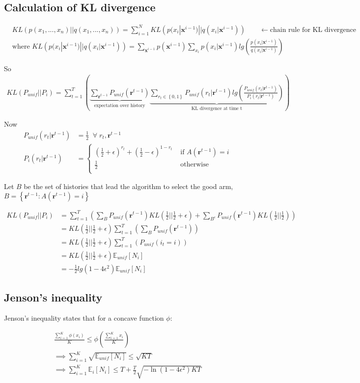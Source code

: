 \documentclass{article}
\newcommand{\E}{\mathbb E}
\newcommand{\set}[1]{\left\{#1\right\}}
\newcommand{\eqn}[1]{\begin{align}#1\end{align}}
\renewcommand{\Pi}[1]{P_i\left( #1 \right)}
\newcommand{\Pu}[1]{P_{unif}\left( #1 \right)}
\newcommand{\Ei}[1]{\E_i\left[ #1 \right]}
\newcommand{\Eu}[1]{\E_{unif}\left[ #1 \right]}
\renewcommand{\r}{\boldsymbol{r}}
\renewcommand{\log}[1]{lg\left( #1 \right)}
\newcommand{\kl}[2]{KL\left(#1 || #2 \right)}
\theoremstyle{plain}
\theoremstyle{definition}
\begin{document}
\subsection{Calculation of KL divergence}
\label{sec:calculation_of_divergence}
\eqn{
& \kl{p(x_1,...,x_n)}{q(x_1,...,x_n)} =  \sum_{i=1}^N \kl{p(x_i|\boldsymbol{x}^{i-1})}{q(x_i|\boldsymbol{x}^{i-1})} \qquad \leftarrow \text{chain rule for KL divergence} \\
& \text{where } \kl{p(x_i|\boldsymbol{x}^{i-1})}{q(x_i|\boldsymbol{x}^{i-1})} = 
\sum_{\boldsymbol{x}^{i-1}}p(\boldsymbol{x}^{i-1})\sum_{x_i}p(x_i|\boldsymbol{x}^{i-1})\log{\frac{p(x_i|\boldsymbol{x}^{i-1})}{q(x_i|\boldsymbol{x}^{i-1})}}
}

So 
\eqn {
\kl{P_{unif}}{P_i} = \sum_{t=1}^T\left(
\underbrace{\sum_{\r^{t-1}}\Pu{\r^{t-1}}}_{\text{expectation over history}}
\underbrace{\sum_{r_t \in \set{0,1}}\Pu{r_t|\r^{t-1}}\log{\frac{\Pu{r_t|\r^{t-1}}}{\Pi{r_t|\r^{t-1}}}}}_{\text{KL divergence at time t}}
\right)
}

Now 
\eqn{
\Pu{r_t|\r^{t-1}}& = \frac{1}{2} \;\; \forall \;{r_t,\r^{t-1}} \\
\Pi{r_t|\r^{t-1}}&=
\begin{cases}
(\frac{1}{2}+\epsilon)^{r_t}+(\frac{1}{2}-\epsilon)^{1-r_t} & \text{ if } A(\r^{t-1}) = i\\
\frac{1}{2} & \text{ otherwise}\\
\end{cases}
}

Let $B$ be the set of histories that lead the algorithm to select the good arm, $B =\set{ \r^{t-1}:A(\r^{t-1})=i}$

\eqn {
\kl{P_{unif}}{P_i} &= \sum_{t=1}^T\left(
\sum_{B}\Pu{\r^{t-1}}
\kl{\frac{1}{2}}{\frac{1}{2}+\epsilon}
+ \sum_{B^c}\Pu{\r^{t-1}}
\kl{\frac{1}{2}}{\frac{1}{2}}
\right)\\
&= \kl{\frac{1}{2}}{\frac{1}{2}+\epsilon}\sum_{t=1}^T\left(
\sum_{B}\Pu{\r^{t-1}}
\right)\\
&=\kl{\frac{1}{2}}{\frac{1}{2}+\epsilon} \sum_{t=1}^T\left(
\Pu{i_t=i}
\right)\\
&=\kl{\frac{1}{2}}{\frac{1}{2}+\epsilon}\Eu{N_i}\\
&=-\frac{1}{2}\log{1-4\epsilon^2}\Eu{N_i}
}
\pagebreak
\subsection{Jenson's inequality}
Jenson's inequality states that for a concave function $\phi$:

\eqn{
\frac{\sum_{i=1}^K \phi(x_i)}{K} \leq \phi \left(\frac{\sum_{i=1}^K x_i}{K} \right) \\
\implies  \sum_{i=1}^K \sqrt{\Eu{N_i}} \leq \sqrt{KT} \\
\implies \sum_{i=1}^K\Ei{N_i} \leq T+ \frac{T}{2} \sqrt{-\ln(1-4\epsilon^2)KT}
}
\end{document}
